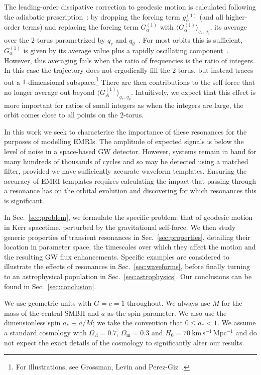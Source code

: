 \documentclass[aps,prd,amsfonts,amssymb,amsmath,nofootinbib,showpacs,superscriptaddress,twocolumn]{revtex4}
\newcommand{\secref}[1]{Sec.~\ref{sec:#1}}
\newcommand{\units}[1]{\ensuremath{~\mathrm{#1}}}
\newcommand{\sub}[1]{\ensuremath{_\mathrm{#1}}}
\begin{document}
The leading-order dissipative correction to geodesic motion is calculated following the adiabatic prescription~\cite{Hinderer2008}: by dropping the forcing term $g_\alpha^{(1)}$ (and all higher-order terms) and replacing the forcing term $G_\alpha^{(1)}$ with $\langle G_\alpha^{(1)}\rangle_{q_r,\,q_\theta}$, its average over the $2$-torus parametrized by $q_r$ and $q_\theta$~\cite{Drasco2005}. For most orbits this is sufficient, $G_\alpha^{(1)}$ is given by its average value plus a rapidly oscillating component~\cite{Arnold1988}. %
However, this averaging fails when the ratio of frequencies is the ratio of integers. In this case the trajectory does not ergodically fill the $2$-torus, but instead traces out a $1$-dimensional subspace.\footnote{For illustrations, see Grossman, Levin and Perez-Giz~\cite{Grossman2012}.} There are then contributions to the self-force that no longer average out beyond $\langle G_A^{(1)}\rangle_{q_r,\,q_\theta}$. Intuitively, we expect that this effect is more important for ratios of small integers as when the integers are large, the orbit comes close to all points on the $2$-torus.

In this work we seek to characterise the importance of these resonances for the purposes of modelling EMRIs. The amplitude of expected signals is below the level of noise in a space-based GW detector. However, systems remain in band for many hundreds of thousands of cycles and so may be detected using a matched filter, provided we have sufficiently accurate waveform templates. Ensuring the accuracy of EMRI templates requires calculating the impact that passing through a resonance has on the orbital evolution and discovering for which resonances this is significant.

In \secref{problem}, we formulate the specific problem: that of geodesic motion in Kerr spacetime, perturbed by the gravitational self-force. We then study generic properties of transient resonances in \secref{properties}, detailing their location in parameter space, the timescales over which they affect the motion and the resulting GW flux enhancements. Specific examples are considered to illustrate the effects of resonances in \secref{waveforms}, before finally turning to an astrophysical population in \secref{astrophysics}. Our conclusions can be found in \secref{conclusion}.

We use geometric units with $G = c = 1$ throughout. We always use $M$ for the mass of the central SMBH and $a$ as the spin parameter. We also use the dimensionless spin $a_\ast \equiv a/M$; we take the convention that $0 \leq a_\ast < 1$. We assume a standard cosmology with $\Omega_\Lambda = 0.7$, $\Omega\sub{m} = 0.3$ and $H_0 = 70\units{km\, s^{-1}\, Mpc^{-1}}$ and do not expect the exact details of the cosmology to significantly alter our results.
\end{document}
